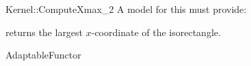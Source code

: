 \begin{ccRefFunctionObjectConcept}{Kernel::ComputeXmax_2}
A model for this must provide:


       {returns the largest $x$-coordinate of the isorectangle.}


\ccRefines
AdaptableFunctor



\end{ccRefFunctionObjectConcept}
